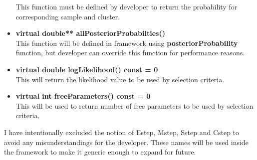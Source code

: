 \documentclass[a4paper,11pt]{article}
\begin{document}
\begin{itemize}
This function must be defined by developer to return the probability for corresponding sample and cluster. 
\item {\bf virtual double** allPosteriorProbabilties()}\\
This function will be defined in framework using {\bf posteriorProbability} function, but developer can override this function for performance reasons.
\item {\bf virtual double logLikelihood() const = 0}\\
This will return the likelihood value to be used by selection criteria.
\item {\bf virtual int freeParameters() const = 0}\\
This will be used to return number of free parameters to be used by selection criteria.
\end{itemize}

I have intentionally excluded the notion of Estep, Mstep, Sstep and Cstep to avoid any misunderstandings for the developer.  These names will be used inside the framework to make it generic enough to expand for future.    
   
\end{document}
